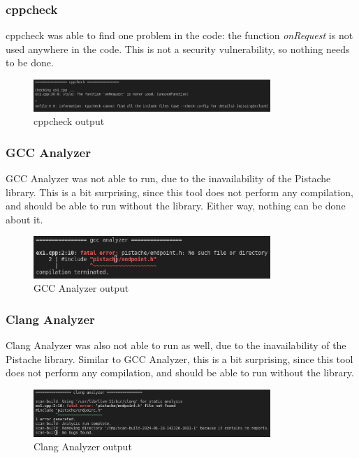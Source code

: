 \documentclass{article}
\begin{document}
\subsubsection{cppcheck}

cppcheck was able to find one problem in the code: the function \textit{onRequest} is not used anywhere in the code. This is not a security vulnerability, so nothing needs to be done.

\begin{figure}[ht!]
    \centering
    \includegraphics[width=0.8\textwidth]{images/ex1/cppcheck.png}
    \caption{cppcheck output}\label{fig:ex1/cppcheck}
\end{figure}

\subsubsection{GCC Analyzer}

GCC Analyzer was not able to run, due to the inavailability of the Pistache library. This is a bit surprising, since this tool does not perform any compilation, and should be able to run without the library. Either way, nothing can be done about it.

\begin{figure}[ht!]
    \centering
    \includegraphics[width=0.8\textwidth]{images/ex1/gccAnalyzer.png}
    \caption{GCC Analyzer output}
    \label{fig:ex1/gccAnalyzer}
\end{figure}

\subsubsection{Clang Analyzer}

Clang Analyzer was also not able to run as well, due to the inavailability of the Pistache library. Similar to GCC Analyzer, this is a bit surprising, since this tool does not perform any compilation, and should be able to run without the library.

\begin{figure}[ht!]
    \centering
    \includegraphics[width=0.8\textwidth]{images/ex1/clangAnalyzer.png}
    \caption{Clang Analyzer output}\label{fig:ex1/clangAnalyzer}
\end{figure}
\end{document}

